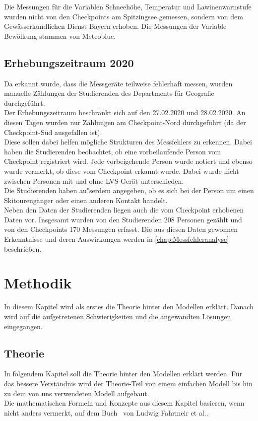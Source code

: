 \documentclass[12pt]{scrreprt}
\begin{document}
\noindent Die Messungen für die Variablen Schneehöhe, Temperatur und Lawinenwarnstufe wurden nicht von den Checkpoints am Spitzingsee gemessen, sondern von dem Gewässerkundlichen Dienst Bayern erhoben. Die Messungen der Variable Bewölkung stammen von Meteoblue. %

\section{Erhebungszeitraum 2020}
Da erkannt wurde, dass die Messgeräte teilweise fehlerhaft messen, wurden manuelle Zählungen der Studierenden des Departments für Geografie durchgeführt. \\
Der Erhebungszeitraum beschränkt sich auf den 27.02.2020 und 28.02.2020. An diesen Tagen wurden nur Zählungen am Checkpoint-Nord durchgeführt (da der Checkpoint-Süd ausgefallen ist). \\
Diese sollen dabei helfen mögliche Strukturen des Messfehlers zu erkennen. Dabei haben die Studierenden beobachtet, ob eine vorbeilaufende Person vom Checkpoint registriert wird. Jede vorbeigehende Person wurde notiert und ebenso wurde vermerkt, ob diese vom Checkpoint erkannt wurde. Dabei wurde nicht zwischen Personen mit und ohne LVS-Gerät unterschieden.\\ Die Studierenden haben au"serdem angegeben, ob es sich bei der Person um einen Skitourengänger oder einen anderen Kontakt handelt. \\
Neben den Daten der Studierenden liegen auch die vom Checkpoint erhobenen Daten vor. Insgesamt wurden von den Studierenden 208 Personen gezählt und von den Checkpoints 170 Messungen erfasst. Die aus diesen Daten gewonnen Erkenntnisse und deren Auswirkungen werden in \autoref{chap:Messfehleranalyse} beschrieben. 

\chapter{Methodik}
\vspace{-0.5cm}
In diesem Kapitel wird als erstes die Theorie hinter den Modellen erklärt. Danach wird auf die aufgetretenen Schwierigkeiten und die angewandten Lösungen eingegangen.

\section{Theorie}
In folgendem Kapitel soll die Theorie hinter den Modellen erklärt werden. Für das bessere Verständnis wird der Theorie-Teil von einem einfachen Modell bis hin zu dem von uns verwendeten Modell aufgebaut. \\
Die mathematischen Formeln und Konzepte aus diesem Kapitel basieren, wenn nicht anders vermerkt, auf dem Buch \grqq ~von Ludwig Fahrmeir et al..
\end{document}
